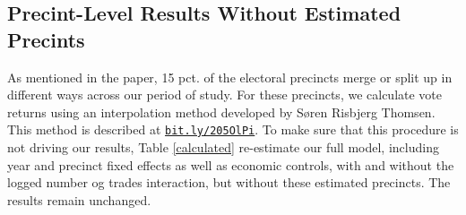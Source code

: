 \documentclass[12pt,a4paper]{article}
\begin{document}
			\newpage
			
			\subsection{Precint-Level Results Without Estimated Precints} \label{calc}
				\setcounter{table}{0}
			\setcounter{figure}{0}
			
			As mentioned in the paper, 15 pct. of the electoral precincts merge or split up in different ways  across our period of study. For these precincts, we calculate vote returns using an interpolation method developed by Søren Risbjerg Thomsen. This method is described at \texttt{\href{http://bit.ly/205OlPi}{bit.ly/205OlPi}}. To make sure that this procedure is not driving our results, Table \ref{calculated} re-estimate our full model, including year and precinct fixed effects as well as economic controls, with and without the logged number og trades interaction, but without these estimated precincts. The results remain unchanged.  
			
			
			
			
		
\end{document}
